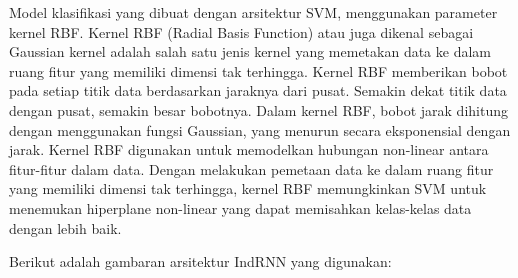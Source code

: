 Model klasifikasi yang dibuat dengan arsitektur SVM, menggunakan parameter kernel RBF.
Kernel RBF (Radial Basis Function) atau juga dikenal sebagai Gaussian kernel adalah 
salah satu jenis kernel yang memetakan data ke dalam ruang fitur yang memiliki dimensi tak 
terhingga. Kernel RBF memberikan bobot pada setiap titik data berdasarkan jaraknya dari pusat. 
Semakin dekat titik data dengan pusat, semakin besar bobotnya. Dalam kernel RBF, bobot jarak 
dihitung dengan menggunakan fungsi Gaussian, yang menurun secara eksponensial dengan 
jarak. Kernel RBF digunakan untuk memodelkan hubungan non-linear antara fitur-fitur dalam 
data. Dengan melakukan pemetaan data ke dalam ruang fitur yang memiliki dimensi tak 
terhingga, kernel RBF memungkinkan SVM untuk menemukan hiperplane non-linear yang 
dapat memisahkan kelas-kelas data dengan lebih baik.

Berikut adalah gambaran arsitektur IndRNN yang digunakan:

